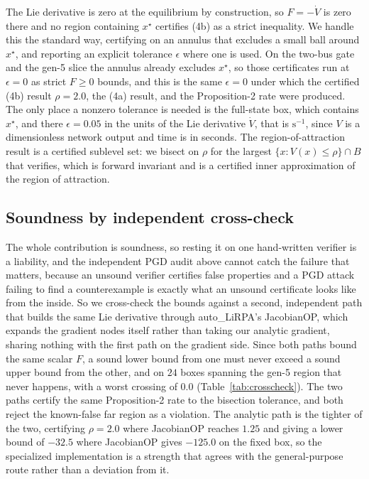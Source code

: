 \documentclass[letterpaper,journal]{IEEEtran}
\newcommand{\Lie}{\dot{V}}
\newcommand{\xstar}{x^\star}
\begin{document}
The Lie derivative is zero at the equilibrium by construction, so $F=-\Lie$ is
zero there and no region containing $\xstar$ certifies (4b) as a strict
inequality. We handle this the standard way, certifying on an annulus that
excludes a small ball around $\xstar$, and reporting an explicit tolerance
$\epsilon$ where one is used. On the two-bus gate and the gen-5 slice the annulus
already excludes $\xstar$, so those certificates run at $\epsilon=0$ as strict
$F\ge 0$ bounds, and this is the same $\epsilon=0$ under which the certified (4b)
result $\rho=2.0$, the (4a) result, and the Proposition-2 rate were produced. The
only place a nonzero tolerance is needed is the full-state box, which contains
$\xstar$, and there $\epsilon=0.05$ in the units of the Lie derivative $\Lie$,
that is $\mathrm{s}^{-1}$, since $V$ is a dimensionless network output and time is
in seconds. The region-of-attraction result is a
certified sublevel set: we bisect on $\rho$ for the largest
$\{x: V(x)\le\rho\}\cap B$ that verifies, which is forward invariant and is a
certified inner approximation of the region of attraction.

\subsection{Soundness by independent cross-check}
The whole contribution is soundness, so resting it on one hand-written verifier is
a liability, and the independent PGD audit above cannot catch the failure that
matters, because an unsound verifier certifies false properties and a PGD attack
failing to find a counterexample is exactly what an unsound certificate looks like
from the inside. So we cross-check the bounds against a second, independent path
that builds the same Lie derivative through auto\_LiRPA's JacobianOP, which expands
the gradient nodes itself rather than taking our analytic gradient, sharing nothing
with the first path on the gradient side. Since both paths bound the same scalar
$F$, a sound lower bound from one must never exceed a sound upper bound from the
other, and on $24$ boxes spanning the gen-5 region that never happens, with a worst
crossing of $0.0$ (Table~\ref{tab:crosscheck}). The two paths certify the same
Proposition-2 rate to the bisection tolerance, and both reject the known-false far
region as a violation. The analytic path is the tighter of the two, certifying
$\rho=2.0$ where JacobianOP reaches $1.25$ and giving a lower bound of $-32.5$ where
JacobianOP gives $-125.0$ on the fixed box, so the specialized implementation is a
strength that agrees with the general-purpose route rather than a deviation from it.
\end{document}
